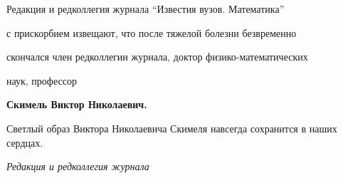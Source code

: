 




\pagestyle{empty}





\vspace*{5cm}





Редакция и редколлегия журнала ``Известия вузов. Математика''


с прискорбием извещают, что после тяжелой болезни безвременно 


скончался член редколлегии журнала, доктор физико-математических 


наук, профессор


\medskip


\begin{center}


{\bf Скимель Виктор Николаевич.}


\end{center}


\medskip





Светлый образ Виктора Николаевича Скимеля навсегда сохранится в наших сердцах.


\medskip


 


{\it \hfill Редакция и редколлегия журнала }











